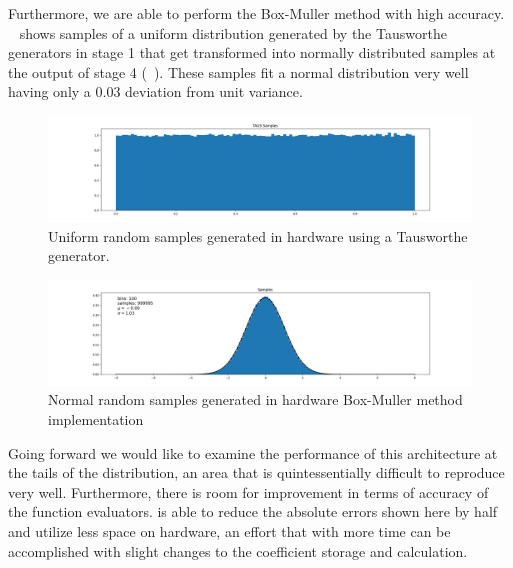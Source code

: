 Furthermore, we are able to perform the Box-Muller method with high accuracy. \Figure~ shows samples of a uniform distribution generated by the Tausworthe generators in stage 1 that get transformed into normally distributed samples at the output of stage 4 (\Figure~). These samples fit a normal distribution very well having only a 0.03 deviation from unit variance.

\begin{figure}
\centering\CaptionFontSize
\includegraphics[width=\textwidth]
{Figures/uniform_dist.png}
\caption[Uniform random samples generated in hardware using a Tausworthe generator]
{Uniform random samples generated in hardware using a Tausworthe generator.}
\label{Figure:NoiseGeneration:UniformSamples}
\end{figure}
\begin{figure}
\centering\CaptionFontSize
\includegraphics[width=\textwidth]
{Figures/normal_dist.png}
\caption[Normal random samples generated in hardware Box-Muller method implementation]
{Normal random samples generated in hardware Box-Muller method implementation}
\label{Figure:NoiseGeneration:NormalSamples}
\end{figure}

Going forward we would like to examine the performance of this architecture at the tails of the distribution, an area that is quintessentially difficult to reproduce very well. Furthermore, there is room for improvement in terms of accuracy of the function evaluators. \cite{noise_gen} is able to reduce the absolute errors shown here by half and utilize less space on hardware, an effort that with more time can be accomplished with slight changes to the coefficient storage and calculation.
